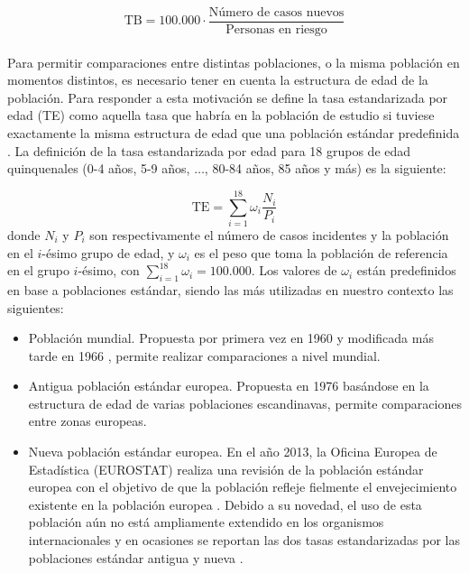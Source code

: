 $$\text{TB}  = 100.000 \cdot \dfrac{\text{Número de casos nuevos}}{\text{Personas en riesgo}}$$\\

Para permitir comparaciones entre distintas poblaciones, o la misma población en momentos distintos, es necesario tener en cuenta la estructura de edad de la población. Para responder a esta motivación se define la tasa estandarizada por edad (TE) como aquella tasa que habría en la población de estudio si tuviese exactamente la misma estructura de edad que una población estándar predefinida \cite{IARC1995}. La definición de la tasa estandarizada por edad para 18 grupos de edad quinquenales (0-4 años, 5-9 años, $\dots$, 80-84 años, 85 años y más) es la siguiente:

$$\text{TE} = \sum_{i = 1}^{18} \omega_i \dfrac{N_i}{P_i} $$
donde $N_i$ y $P_i$ son respectivamente el número de casos incidentes y la población en el $i$-ésimo grupo de edad, y $\omega_i$ es el peso que toma la población de referencia en el grupo $i$-ésimo, con $\sum_{i = 1}^{18}\omega_i = 100.000$. Los valores de ${\omega_i}$ están predefinidos en base a poblaciones estándar, siendo las más utilizadas en nuestro contexto las siguientes:

\begin{itemize}
	
	\item Población mundial. Propuesta por primera vez en 1960 \cite{SegiM.1960} y modificada más tarde en 1966 \cite{Doll1966}, permite realizar comparaciones a nivel mundial.
		
	\item Antigua población estándar europea. Propuesta en 1976 \cite{Waterhouse1976} basándose en la estructura de edad de varias poblaciones escandinavas, permite comparaciones entre zonas europeas.
	
	\item Nueva población estándar europea. En el año 2013, la Oficina Europea de Estadística (EUROSTAT) realiza una revisión de la población estándar europea con el objetivo de que la población refleje fielmente el envejecimiento existente en la población europea \cite{EUROSTAT2013}. Debido a su novedad, el uso de esta población aún no está ampliamente extendido en los organismos internacionales \cite{ECIS2} y en ocasiones se reportan las dos tasas estandarizadas por las poblaciones estándar antigua y nueva \cite{ECIS}.
	

\end{itemize}

